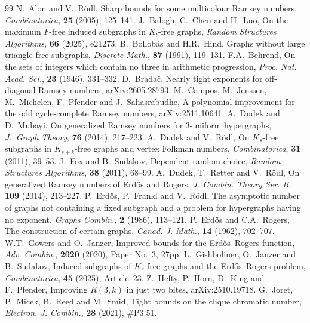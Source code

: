 \documentclass[10pt,a4paper]{amsart}
\numberwithin{theorem}{section}
\renewcommand{\(}{\bigl(}
\renewcommand{\)}{\bigr)\vphantom{)}}
\begin{document}
\begin{thebibliography}{99}
 N.~Alon and V.~R\"odl, Sharp bounds for some multicolour Ramsey numbers, \emph{Combinatorica}, \textbf{25} (2005), 125--141.
 J.~Balogh, C.~Chen and H.~Luo, On the maximum $F$-free induced subgraphs in $K_t$-free graphs, \emph{Random Structures Algorithms}, \textbf{66} (2025), e21273.
 B.~Bollob{\'a}s and H.R.~Hind, Graphs without large triangle-free subgraphs, \emph{Discrete Math.}, \textbf{87} (1991), 119--131.
 F.A.~Behrend, On the sets of integers which contain no three in arithmetic progression, \emph{Proc. Nat. Acad. Sci.}, \textbf{23} (1946), 331--332.
 D.~Brada\v{c}, Nearly tight exponents for off-diagonal Ramsey numbers, arXiv:2605.28793.
 M.~Campos, M.~Jenssen, M.~Michelen, F.~Pfender and J.~Sahasrabudhe, A polynomial improvement for the odd cycle-complete Ramsey numbers, arXiv:2511.10641.
 A.~Dudek and D.~Mubayi, On generalized Ramsey numbers for $3$-uniform hypergraphs, \emph{J.~Graph Theory}, \textbf{76} (2014), 217--223.
 A.~Dudek and V.~R\"odl, On $K_s$-free subgraphs in $K_{s+k}$-free graphs and vertex Folkman numbers, \emph{Combinatorica}, \textbf{31} (2011), 39--53.
 J.~Fox and B.~Sudakov, Dependent random choice, \emph{Random Structures Algorithms}, \textbf{38} (2011), 68--99.
 A.~Dudek, T.~Retter and V.~R\"odl, On generalized Ramsey numbers of Erd\H{o}s and Rogers, \emph{J. Combin. Theory Ser. B}, \textbf{109} (2014), 213--227.
 P.~Erd\H{o}s, P.~Frankl and V.~R\"odl, The asymptotic number of graphs not containing a fixed subgraph and a problem for hypergraphs having no exponent, \emph{Graphs Combin.}, \textbf{2} (1986), 113--121.
 P.~Erd\H{o}s and C.A.~Rogers, The construction of certain graphs, \emph{Canad. J. Math.}, \textbf{14} (1962), 702--707.
 W.T.~Gowers and O.~Janzer, Improved bounds for the Erd\H{o}s--Rogers function, \emph{Adv. Combin.}, \textbf{2020} (2020), Paper No.~3, 27pp.
 L.~Gishboliner, O.~Janzer and B.~Sudakov, Induced subgraphs of $K_r$-free graphs and the Erd\H{o}s--Rogers problem, \emph{Combinatorica}, \textbf{45} (2025), Article~23.
 Z.~Hefty, P.~Horn, D.~King and F.~Pfender, Improving $R(3,k)$ in just two bites, arXiv:2510.19718.
 G.~Joret, P.~Micek, B.~Reed and M.~Smid, Tight bounds on the clique chromatic number, \emph{Electron. J. Combin.}, \textbf{28} (2021), \#P3.51.

\end{thebibliography}
\end{document}
